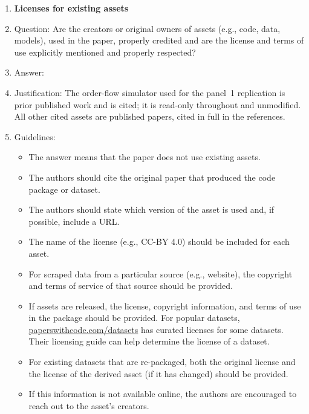 \begin{enumerate}
\item {\bf Licenses for existing assets}
    \item[] Question: Are the creators or original owners of assets (e.g., code, data, models), used in the paper, properly credited and are the license and terms of use explicitly mentioned and properly respected?
    \item[] Answer: \answerYes{}
    \item[] Justification: The order-flow simulator used for the panel~1 replication is prior published work and is cited; it is read-only throughout and unmodified. All other cited assets are published papers, cited in full in the references.
    \item[] Guidelines:
    \begin{itemize}
        \item The answer \answerNA{} means that the paper does not use existing assets.
        \item The authors should cite the original paper that produced the code package or dataset.
        \item The authors should state which version of the asset is used and, if possible, include a URL.
        \item The name of the license (e.g., CC-BY 4.0) should be included for each asset.
        \item For scraped data from a particular source (e.g., website), the copyright and terms of service of that source should be provided.
        \item If assets are released, the license, copyright information, and terms of use in the package should be provided. For popular datasets, \url{paperswithcode.com/datasets} has curated licenses for some datasets. Their licensing guide can help determine the license of a dataset.
        \item For existing datasets that are re-packaged, both the original license and the license of the derived asset (if it has changed) should be provided.
        \item If this information is not available online, the authors are encouraged to reach out to the asset's creators.
    \end{itemize}


\end{enumerate}

